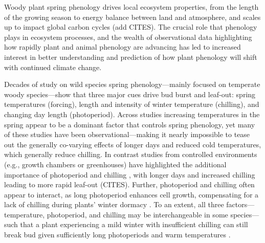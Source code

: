 \documentclass[11pt]{article}
\begin{document}


Woody plant spring phenology drives local ecosystem properties, from the length of the growing season to energy balance between land and atmosphere, and scales up to impact global carbon cycles (add CITES). The crucial role that phenology plays in ecosystem processes, and the wealth of observational data highlighting how rapidly plant and animal phenology are advancing \cite{Menzel:2006} has led to increased interest in better understanding and prediction of how plant phenology will shift with continued climate change.

Decades of study on wild species spring phenology---mainly focused on temperate woody species---show that three major cues drive bud burst and leaf-out: spring temperatures (forcing), length and intensity of winter temperature (chilling), and changing day length (photoperiod). Across studies increasing temperatures in the spring appear to be a dominant factor that controls spring phenology, yet many of these studies have been observational---making it nearly impossible to tease out the generally co-varying effects of longer days and reduced cold temperatures, which generally reduce chilling. In contrast studies from controlled environments (e.g., growth chambers or greenhouses) have highlighted the additional importance of photoperiod and chilling \cite{Heide:1993b,Falusi:1996aa,Foley:2009aa,Ghelardini:2010aa,Caffarra:2011aa}, with longer days and increased chilling leading to more rapid leaf-out (CITES). Further, photoperiod and chilling often appear to interact, as long photoperiod enhances cell growth, compensating for a lack of chilling during plants' winter dormacy \cite{Heide:1993b}\cite{Caffarra:2011aa}\cite{Myking:1995}. To an extent, all three factors---temperature, photoperiod, and chilling may be interchangeable in some species---such that a plant experiencing a mild winter with insufficient chilling can still break bud given sufficiently long photoperiods and warm temperatures \cite{Heide:1993b}. 
\end{document}
